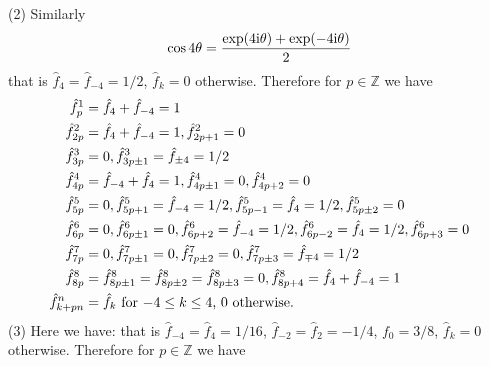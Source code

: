\documentclass[12pt,a4paper]{article}
\def\bbZ{ {\mathbb Z} }
\begin{document}
(2) Similarly
\[
\cos 4 \ensuremath{\theta} = {\exp(4{\rm i} \ensuremath{\theta}) + \exp(-4{\rm i} \ensuremath{\theta}) \over 2}
\]
that is $\hat f_4 = \hat f_{-4} = 1/2$, $\hat f_k = 0$ otherwise. Therefore for $p\ensuremath{\in} \ensuremath{\bbZ}$ we have
\begin{align*}
\hat f_p^1 &= \hat f_4 + \hat f_{-4} = 1 \\
\hat f_{2p}^2 &= \hat f_4 + \hat f_{-4} = 1, \hat f_{2p+1}^2 = 0 \\
\hat f_{3p}^3 &= 0, \hat f_{3p\ensuremath{\pm}1}^3 = \hat f_{\ensuremath{\pm}4} =1/2 \\
\hat f_{4p}^4 &= \hat f_{-4} + \hat f_4 = 1, \hat f_{4p\ensuremath{\pm}1}^4 = 0,  \hat f_{4p+2}^4 = 0 \\
\hat f_{5p}^5 &= 0, \hat f_{5p+1}^5 = \hat f_{-4} = 1/2, \hat f_{5p-1}^5 = \hat f_{4} = 1/2,  \hat f_{5p\ensuremath{\pm}2}^5 =0  \\
\hat f_{6p}^6 &=0, \hat f_{6p\ensuremath{\pm}1}^6 = 0,  \hat f_{6p+2}^6 = \hat f_{-4} = 1/2,  \hat f_{6p-2}^6 = \hat f_{4} = 1/2, \hat f_{6p+3}^6 =0  \\
\hat f_{7p}^7 &= 0, \hat f_{7p\ensuremath{\pm}1}^7 = 0,  \hat f_{7p\ensuremath{\pm}2}^7 = 0, \hat f_{7p\ensuremath{\pm}3}^7 = \hat f_{\ensuremath{\mp}4} = 1/2 \\
\hat f_{8p}^8 &= \hat f_{8p\ensuremath{\pm}1}^8 = \hat f_{8p\ensuremath{\pm}2}^8 =  \hat f_{8p\ensuremath{\pm}3}^8 = 0, \hat f_{8p+4}^8 = \hat f_4 + \hat f_{-4} = 1 \\
\hat f_{k+pn}^n &= \hat f_k \hbox{ for $-4 \ensuremath{\leq} k \ensuremath{\leq} 4$, 0 otherwise}.
\end{align*}
(3) Here we have:
that is $\hat f_{-4} = \hat f_4 = 1/16$, $\hat f_{-2} = \hat f_2 = -1/4$, $f_0 = 3/8$, $\hat f_k = 0$ otherwise. Therefore for $p\ensuremath{\in} \ensuremath{\bbZ}$ we have
\end{document}
